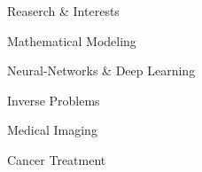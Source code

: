 \begin{rSection}{Reaserch \& Interests}	
	\begin{rSubsection}{}{}{}{}
		\item Mathematical Modeling
		\item Neural-Networks \& Deep Learning
		\item Inverse Problems
		\item Medical Imaging
		\item Cancer Treatment	
	\end{rSubsection}
\end{rSection}